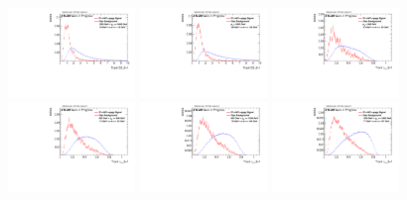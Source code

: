 \begin{figure}
\includegraphics[width=0.3\textwidth]{sascha_input/Appendix/Distributions/w/distributions/beta1/h_normal_tj_D2_bin5.pdf} \hspace{1mm}
\includegraphics[width=0.3\textwidth]{sascha_input/Appendix/Distributions/w/distributions/beta1/h_normal_tj_D2_bin6.pdf}
\bigskip
\includegraphics[width=0.3\textwidth]{sascha_input/Appendix/Distributions/w/distributions/beta1/h_normal_tj_nSub21_bin1.pdf} \hspace{1mm}
\includegraphics[width=0.3\textwidth]{sascha_input/Appendix/Distributions/w/distributions/beta1/h_normal_tj_nSub21_bin2.pdf} \hspace{1mm}
\includegraphics[width=0.3\textwidth]{sascha_input/Appendix/Distributions/w/distributions/beta1/h_normal_tj_nSub21_bin3.pdf} 
\bigskip
\includegraphics[width=0.3\textwidth]{sascha_input/Appendix/Distributions/w/distributions/beta1/h_normal_tj_nSub21_bin4.pdf} \hspace{6mm}

\end{figure}
